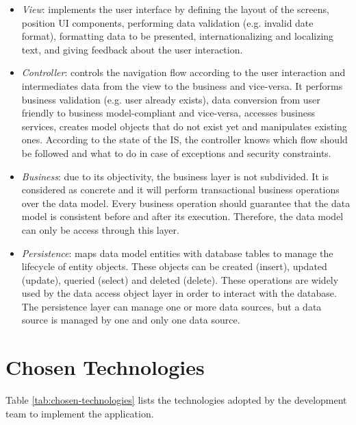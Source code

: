 \documentclass[envcountsame,envcountchap,letterpaper]{svmono}
\begin{document}
\begin{itemize}
\item \textit{View}: implements the user interface by defining the layout of the screens, position UI components, performing data validation (e.g. invalid date format), formatting data to be presented, internationalizing and localizing text, and giving feedback about the user interaction.

\item \textit{Controller}: controls the navigation flow according to the user interaction and intermediates data from the view to the business and vice-versa. It performs business validation (e.g. user already exists), data conversion from user friendly to business model-compliant and vice-versa, accesses business services, creates model objects that do not exist yet and manipulates existing ones. According to the state of the IS, the controller knows which flow should be followed and what to do in case of exceptions and security constraints.

\item \textit{Business}: due to its objectivity, the business layer is not subdivided. It is considered as concrete and it will perform transactional business operations over the data model. Every business operation should guarantee that the data model is consistent before and after its execution. Therefore, the data model can only be access through this layer.

\item \textit{Persistence}: maps data model entities with database tables to manage the lifecycle of entity objects. These objects can be created (insert), updated (update), queried (select) and deleted (delete). These operations are widely used by the data access object layer in order to interact with the database. The persistence layer can manage one or more data sources, but a data source is managed by one and only one data source.
\end{itemize}

\section{Chosen Technologies}

Table \ref{tab:chosen-technologies} lists the technologies adopted by the development team to implement the application.
\end{document}
